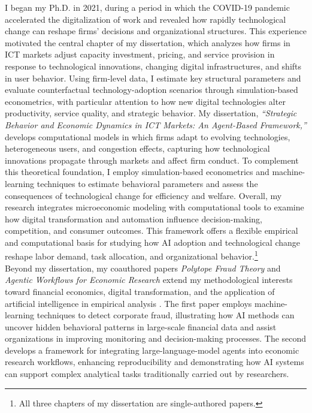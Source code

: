 \documentclass{nfr}
\begin{document}
I began my Ph.D. in 2021, during a period in which the COVID-19 pandemic accelerated the digitalization of work and revealed how rapidly technological change can reshape firms’ decisions and organizational structures. 
This experience motivated the central chapter of my dissertation, which analyzes how firms in ICT markets adjust capacity investment, pricing, and service provision in response to technological innovations, changing digital infrastructures, and shifts in user behavior. 
Using firm-level data, I estimate key structural parameters and evaluate counterfactual technology-adoption scenarios through simulation-based econometrics, with particular attention to how new digital technologies alter productivity, service quality, and strategic behavior.
My dissertation, \textit{“Strategic Behavior and Economic Dynamics in ICT Markets: An Agent-Based Framework,”} develops computational models in which firms adapt to evolving technologies, heterogeneous users, and congestion effects, capturing how technological innovations propagate through markets and affect firm conduct. 
To complement this theoretical foundation, I employ simulation-based econometrics and machine-learning techniques to estimate behavioral parameters and assess the consequences of technological change for efficiency and welfare. 
Overall, my research integrates microeconomic modeling with computational tools to examine how digital transformation and automation influence decision-making, competition, and consumer outcomes. 
This framework offers a flexible empirical and computational basis for studying how AI adoption and technological change reshape labor demand, task allocation, and organizational behavior.\footnote{All three chapters of my dissertation are single-authored papers.}\\

Beyond my dissertation, my coauthored papers \textit{Polytope Fraud Theory} and \textit{Agentic Workflows for Economic Research} extend my methodological interests toward financial economics, digital transformation, and the application of artificial intelligence in empirical analysis \citep{Zhao2025, Dawid2025}. 
The first paper employs machine-learning techniques to detect corporate fraud, illustrating how AI methods can uncover hidden behavioral patterns in large-scale financial data and assist organizations in improving monitoring and decision-making processes. 
The second develops a framework for integrating large-language-model agents into economic research workflows, enhancing reproducibility and demonstrating how AI systems can support complex analytical tasks traditionally carried out by researchers. \\
\end{document}
